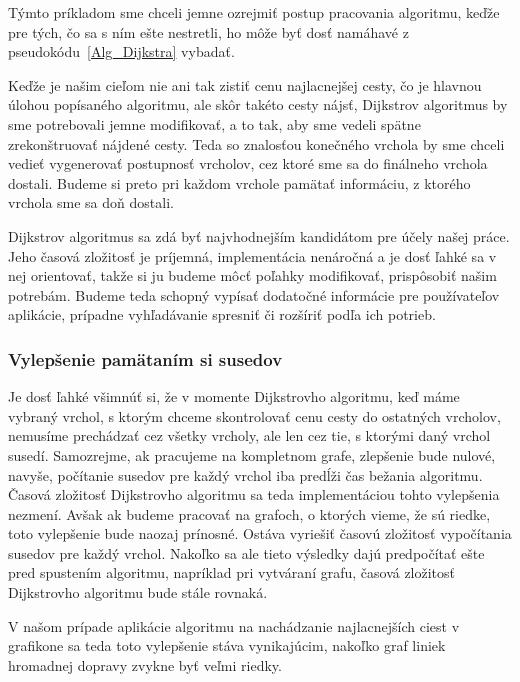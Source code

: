 Týmto príkladom sme chceli jemne ozrejmiť postup pracovania algoritmu, keďže pre tých, čo sa s ním ešte nestretli, ho môže byť dosť namáhavé z pseudokódu~\ref{Alg_Dijkstra} vybadať.\newline

Keďže je našim cieľom nie ani tak zistiť cenu najlacnejšej cesty, čo je hlavnou úlohou popísaného algoritmu, ale skôr takéto cesty nájsť, Dijkstrov algoritmus by sme potrebovali jemne modifikovať, a to tak, aby sme vedeli spätne zrekonštruovať nájdené cesty. Teda so znalosťou konečného vrchola by sme chceli vedieť vygenerovať postupnosť vrcholov, cez ktoré sme sa do finálneho vrchola dostali. Budeme si preto pri každom vrchole pamätať informáciu, z ktorého vrchola sme sa doň dostali.\newline

Dijkstrov algoritmus sa zdá byť najvhodnejším kandidátom pre účely našej práce. Jeho časová zložitosť je príjemná, implementácia nenáročná a je dosť ľahké sa v nej orientovať, takže si ju budeme môcť poľahky modifikovať, prispôsobiť našim potrebám. Budeme teda schopný vypísať dodatočné informácie pre používateľov aplikácie, prípadne vyhľadávanie spresniť či rozšíriť podľa ich potrieb.\newline


\subsubsection{Vylepšenie pamätaním si susedov}

Je dosť ľahké všimnúť si, že v momente Dijkstrovho algoritmu, keď máme vybraný vrchol, s ktorým chceme skontrolovať cenu cesty do ostatných vrcholov, nemusíme prechádzať cez všetky vrcholy, ale len cez tie, s ktorými daný vrchol susedí. Samozrejme, ak pracujeme na kompletnom grafe, zlepšenie bude nulové, navyše, počítanie susedov pre každý vrchol iba predĺži čas bežania algoritmu. Časová zložitosť Dijkstrovho algoritmu sa teda implementáciou tohto vylepšenia nezmení. Avšak ak budeme pracovať na grafoch, o ktorých vieme, že sú riedke, toto vylepšenie bude naozaj prínosné. Ostáva vyriešiť časovú zložitosť vypočítania susedov pre každý vrchol. Nakoľko sa ale tieto výsledky dajú predpočítať ešte pred spustením algoritmu, napríklad pri vytváraní grafu, časová zložitosť Dijkstrovho algoritmu bude stále rovnaká.\newline

V našom prípade aplikácie algoritmu na nachádzanie najlacnejších ciest v grafikone sa teda toto vylepšenie stáva vynikajúcim, nakoľko graf liniek hromadnej dopravy zvykne byť veľmi riedky.\newline


